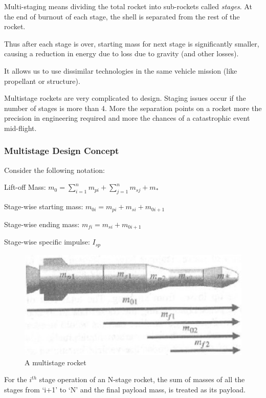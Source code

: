 \documentclass{article}
\theoremstyle{definition}
\begin{document}
Multi-staging means dividing the total rocket into sub-rockets called \emph{stages}.
At the end of burnout of each stage, the shell is separated from the rest of the rocket.

Thus after each stage is over, starting mass for next stage is significantly smaller, causing a reduction in energy due to loss due to gravity (and other losses).

It allows us to use dissimilar technologies in the same vehicle mission (like propellant or structure).

Multistage rockets are very complicated to design. Staging issues occur if the number of stages is more than 4.
More the separation points on a rocket more the precision in engineering required and more the chances of a catastrophic event mid-flight.

\subsubsection{Multistage Design Concept}

Consider the following notation:

Lift-off Mass: $m_0 = \sum_{i=1}^n m_{pi} + \sum_{j=1}^n m_{sj} + m_*  $

Stage-wise starting mass: $m_{0i} = m_{pi} + m_{si} + m_{0i+1} $

Stage-wise ending mass: $m_{fi} = m_{si} + m_{0i+1} $

Stage-wise specific impulse: $I_{sp}$

\begin{figure}[H]
    \centering
    \includegraphics[scale=0.3]{image 14.png}
    \caption{ A multistage rocket }
    \label{fig:multistage}
\end{figure}

For the $i^{th}$ stage operation of an N-stage rocket, the sum of masses of  all the stages from ‘i+1’ to ‘N’ and the final payload mass, is treated as its payload.
\end{document}
